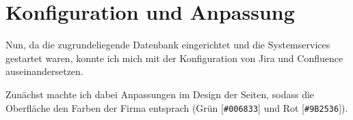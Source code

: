 \documentclass[xcolor=dvipsnames,11pt,paper=a4paper]{report}
\begin{document}
\section{Konfiguration und Anpassung}

Nun, da die zugrundeliegende Datenbank eingerichtet und die Systemservices gestartet
waren, konnte ich mich mit der Konfiguration von Jira und Confluence auseinandersetzen.

Zunächst machte ich dabei Anpassungen im Design der Seiten, sodass die Oberfläche
den Farben der Firma entsprach (\textcolor[HTML]{006833}{Grün [\texttt{\#006833}]}
und \textcolor[HTML]{9B2536}{Rot [\texttt{\#9B2536}]}).




\end{document}
